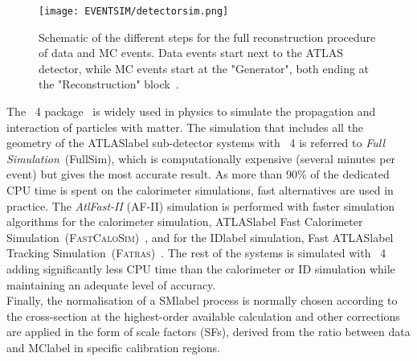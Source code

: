 \begin{figure}[htbp]
    \RawFloats
    \begin{center}
    \texttt{[image: EVENTSIM/detectorsim.png]}
    \caption{
        Schematic of the different steps for the full reconstruction procedure of data and MC events. Data events start next to the ATLAS detector, while MC events start at the "Generator", both ending at the "Reconstruction" block~\cite{Aad_2010}.}
    \label{figEVNTSIM:detectorsim}
    \end{center}
\end{figure}

The \GEANT~4 package~\cite{AGOSTINELLI2003250} is widely used in physics to simulate the propagation and interaction of particles with matter. The simulation that includes all the geometry of the \acrshort{ATLASlabel} sub-detector systems with \GEANT~4 is referred to \textit{Full Simulation}~(FullSim), which is computationally expensive (several minutes per event) but gives the most accurate result. As more than 90\% of the dedicated CPU time is spent on the calorimeter simulations, fast alternatives are used in practice. The \textit{AtlFast-II} (AF-II) simulation is performed with faster simulation algorithms for the calorimeter simulation, \acrshort{ATLASlabel} Fast Calorimeter Simulation~(\textsc{FastCaloSim})~\cite{ATLAS:1300517}, and for the \acrshort{IDlabel} simulation, Fast \acrshort{ATLASlabel} Tracking Simulation~(\textsc{Fatras})~\cite{Edmonds:1091969}. The rest of the systems is simulated with \GEANT~4 adding significantly less CPU time than the calorimeter or ID simulation while maintaining an adequate level of accuracy.\\

Finally, the normalisation of a \acrshort{SMlabel} process is normally chosen according to the cross-section at the highest-order available calculation and other corrections are applied in the form of scale factors (SFs), derived from the ratio between data and \acrshort{MClabel} in specific calibration regions.